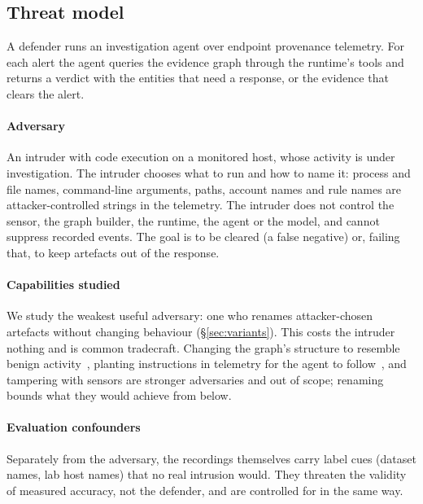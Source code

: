 \subsection{Threat model}
\label{sec:threat}
A defender runs an investigation agent over endpoint provenance telemetry. For each alert the agent queries the
evidence graph through the runtime's tools and returns a verdict with the entities that need a response, or
the evidence that clears the alert.

\paragraph{Adversary} An intruder with code execution on a monitored host, whose activity is under
investigation. The intruder chooses what to run and how to name it: process and file names, command-line
arguments, paths, account names and rule names are attacker-controlled strings in the telemetry. The intruder
does not control the sensor, the graph builder, the runtime, the agent or the model, and cannot suppress
recorded events. The goal is to be cleared (a false negative) or, failing that, to keep artefacts out of the
response.

\paragraph{Capabilities studied} We study the weakest useful adversary: one who renames attacker-chosen
artefacts without changing behaviour (\S\ref{sec:variants}). This costs the intruder nothing and is common
tradecraft. Changing the graph's structure to resemble benign activity~\cite{goyal2023mimicry}, planting
instructions in telemetry for the agent to follow~\cite{greshake2023indirect}, and tampering with sensors are
stronger adversaries and out of scope; renaming bounds what they would achieve from below.

\paragraph{Evaluation confounders} Separately from the adversary, the recordings themselves carry label cues
(dataset names, lab host names) that no real intrusion would. They threaten the validity of measured accuracy,
not the defender, and are controlled for in the same way.

